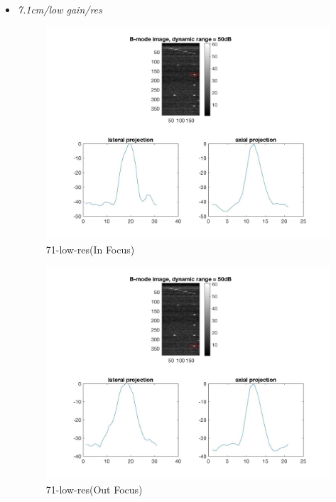 \documentclass[12pts,a4paper]{article}
\begin{document}
\begin{itemize}
\item{\emph{7.1cm/low gain/res}}
\begin{center}
\end{center}
\begin{figure}[h]
    \centering
    \includegraphics[width=1.0\textwidth]{img_hw1/71-low-res1.jpg}
    \caption{71-low-res(In Focus)}
    \label{fig:mesh1}
\end{figure}
\pagebreak
\begin{figure}[h]
    \centering
    \includegraphics[width=1.0\textwidth]{img_hw1/71-low-res2.jpg}
    \caption{71-low-res(Out Focus)}
    \label{fig:mesh1}
\end{figure}
\pagebreak

\end{itemize}
\end{document}
